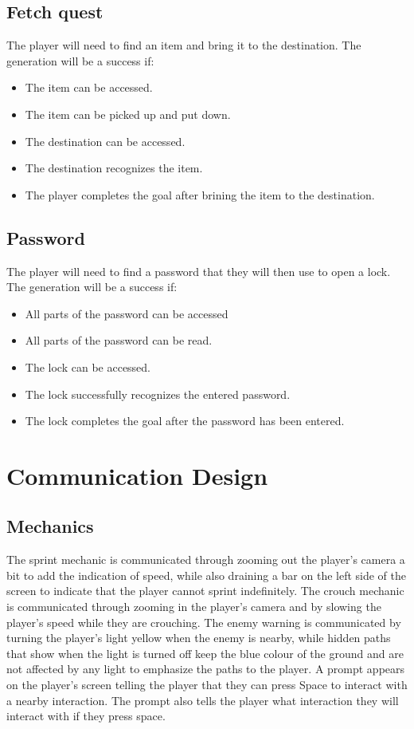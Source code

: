 \documentclass{article}
\begin{document}
\subsection{Fetch quest}
The player will need to find an item and bring it to the destination.
\newline
The generation will be a success if:
\begin{itemize} 
    \item The item can be accessed.
    \item The item can be picked up and put down.
    \item The destination can be accessed.
    \item The destination recognizes the item.
    \item The player completes the goal after brining the item to the destination.
\end{itemize}
\subsection{Password}
The player will need to find a password that they will then use to open a lock.
\newline
The generation will be a success if:
\begin{itemize} 
    \item All parts of the password can be accessed
    \item All parts of the password can be read.
    \item The lock can be accessed.
    \item The lock successfully recognizes the entered password.
    \item The lock completes the goal after the password has been entered.
\end{itemize}




\section{Communication Design}
\subsection{Mechanics}
The sprint mechanic is communicated through zooming out the player's camera a bit to add the indication of speed,
while also draining a bar on the left side of the screen to indicate that the player cannot sprint indefinitely.
The crouch mechanic is communicated through zooming in the player's camera and by slowing the player's speed
while they are crouching.
The enemy warning is communicated by turning the player's light yellow when the enemy is nearby, while hidden paths
that show when the light is turned off keep the blue colour of the ground and are not affected by any light to 
emphasize the paths to the player.
A prompt appears on the player's screen telling the player that they can press Space to interact with a nearby 
interaction. The prompt also tells the player what interaction they will interact with if they press space.
\end{document}
